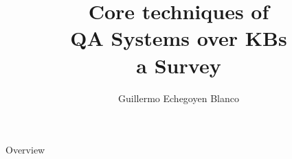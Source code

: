 \documentclass{beamer}
\title{Core techniques of \\ \textbf{QA Systems over KBs \\ a Survey}}
\author{Guillermo Echegoyen Blanco}
\date{}
\begin{document}
\maketitle


\begin{frame}{Overview}
  \begin{card}
    \tableofcontents
  \end{card}
\end{frame}

\end{document}
